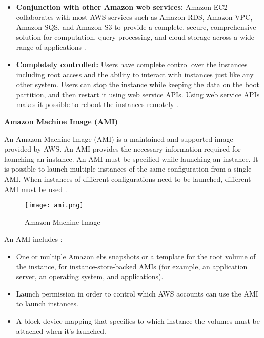 \begin{itemize}
    \item \textbf{Conjunction with other Amazon web
    services:} Amazon EC2 collaborates with most AWS
    services such as Amazon RDS, Amazon VPC, Amazon SQS, and Amazon S3 to provide a complete, secure, comprehensive solution for
    computation, query processing, and cloud storage
    across a wide range of applications \cite{31}.
\end{itemize}

\begin{itemize}
    \item \textbf{Completely controlled:} Users have
    complete control over the instances including root
    access and the ability to interact with instances just like any other system. Users can stop the instance while keeping the data on the boot partition, and then restart it using web service APIs. Using web service APIs makes it possible to reboot the instances remotely \cite{31}.
\end{itemize}

\textbf{Amazon Machine Image (AMI)}

\par An Amazon Machine Image (AMI) is a maintained and
supported image provided by AWS. An AMI provides the necessary information required for launching an instance. An AMI must be specified while launching an instance. It is possible to launch multiple instances of the same configuration from a single AMI. When instances of different configurations need to be launched, different AMI must be used \cite{32}.

\begin{figure}
    \centering
    \texttt{[image: ami.png]}
    \caption{Amazon Machine Image}{\cite{32}}
    \label{fig:ami}
\end{figure}

\par An AMI includes \cite{32}:
\begin{itemize}
    \item One or multiple Amazon \gls{ebs} snapshots or a
    template for the root volume of the instance, for instance-store-backed AMIs (for example, an application server, an operating system, and applications).
\end{itemize}
\begin{itemize}
    \item Launch permission in order to control which AWS accounts can use the AMI to launch instances.
\end{itemize}
\begin{itemize}
    \item A block device mapping that specifies to which instance the volumes must be attached when it’s launched.
\end{itemize}



